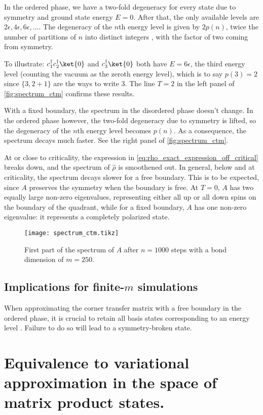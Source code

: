 In the ordered phase, we have a two-fold degeneracy for every state due to symmetry and
ground state energy $E = 0$.
After that, the only available levels are $2\epsilon, 4\epsilon, 6\epsilon,
\dots$.
The degeneracy of the $n$th energy level is given by $2p(n)$, twice the number of partitions of $n$ into distinct integers
\cite{okunishi1999universal}, with the factor of two coming from symmetry.

To illustrate:
$c^{\dagger}_1 c^{\dagger}_2 \ket{0}$ and $c^{\dagger}_3 \ket{0}$ both have $E = 6\epsilon$,
the third energy level (counting the vacuum as the zeroth energy level),
which is to say $p(3) = 2$ since $\{3, 2 + 1 \}$ are the ways to write $3$.
The line $T = 2$ in the left panel of \autoref{fig:spectrum_ctm} confirms these results.

With a fixed boundary, the spectrum in the disordered phase doesn't change.
In the ordered phase however, the two-fold degeneracy due to symmetry is lifted,
so the degeneracy of the $n$th energy level becomes $p(n)$.
As a consequence, the spectrum decays much faster. See the right panel of \autoref{fig:spectrum_ctm}.

At or close to criticality, the expression in \autoref{eq:rho_exact_expression_off_critical} breaks down,
and the spectrum of $\hat{\rho}$ is smoothened out.
In general, below and at criticality, the spectrum decays slower for a free boundary.
This is to be expected, since $A$ preserves the symmetry when the boundary is free.
At $T = 0$, $A$ has two equally large non-zero eigenvalues, representing either all up or all down spins on the boundary
of the quadrant, while for a fixed boundary, $A$ has one non-zero eigenvalue:
it represents a completely polarized state.

\begin{figure}
  \texttt{[image: spectrum\_ctm.tikz]}
  \caption{First part of the spectrum of $A$ after $n = 1000$ steps with a bond dimension of $m =
  250$.}\label{fig:spectrum_ctm}
\end{figure}

\subsection{Implications for finite-$m$ simulations}\label{sec:implications_for_finite_m_simulations}

When approximating the corner transfer matrix with a free boundary in the ordered phase,
it is crucial to retain all basis states corresponding to an energy level \cite{okunishi1999universal}.
Failure to do so will lead to a symmetry-broken state.


\section{Equivalence to variational approximation in the space of matrix product states.}

